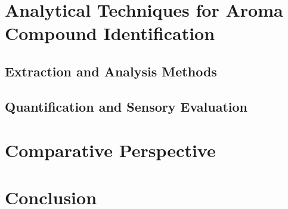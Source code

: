 \section{Analytical Techniques for Aroma Compound Identification}
\subsection{Extraction and Analysis Methods}
\subsection{Quantification and Sensory Evaluation}

\section{Comparative Perspective}

\section{Conclusion}
